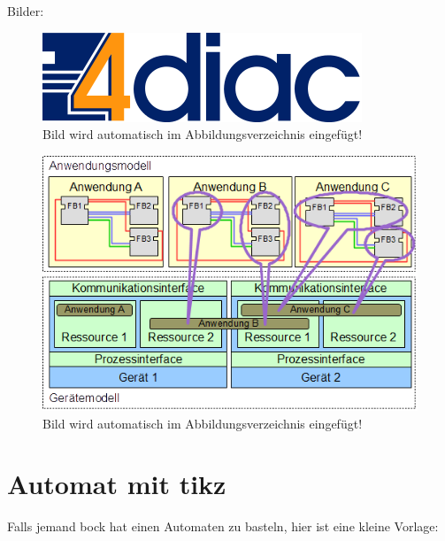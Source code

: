 Bilder:

\begin{figure}[H]
\includegraphics[scale=0.3]{pictures/4diac.png} 
\caption{Bild wird automatisch im Abbildungsverzeichnis eingefügt!}
\label{fig:4diaclogo}
\end{figure}

\begin{figure}[H]
\includegraphics[scale=1]{pictures/IEC61499Modelle.png} 
\caption{Bild wird automatisch im Abbildungsverzeichnis eingefügt!}
\label{fig:iecwiki}
\end{figure}


\chapter{Automat mit tikz}

Falls jemand bock hat einen Automaten zu basteln, hier ist eine kleine Vorlage:


